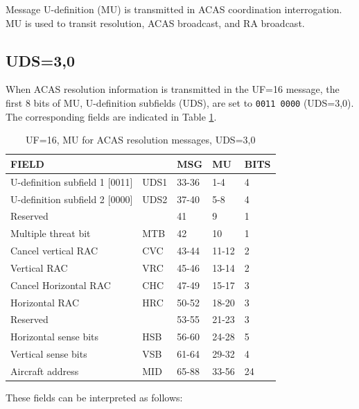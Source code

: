 Message U-definition (MU) is transmitted in ACAS coordination interrogation. MU is used to transit resolution, ACAS broadcast, and RA broadcast.


\subsection{UDS=3,0}

When ACAS resolution information is transmitted in the UF=16 message, the first 8 bits of MU, U-definition subfields (UDS), are set to \texttt{0011 0000} (UDS=3,0). The corresponding fields are indicated in Table \ref{tb:acas_mu_uds30}.

\begin{table}[ht]
\caption{UF=16, MU for ACAS resolution messages, UDS=3,0}
\label{tb:acas_mu_uds30}
\begin{tabular}{|l|l|l|l|l|}
\hline
\textbf{FIELD} & \textbf{} & \textbf{MSG} & \textbf{MU} & \textbf{BITS} \\ \hline
U-definition subfield 1 [0011] & UDS1 & 33-36 & 1-4 & 4 \\ \hline
U-definition subfield 2 [0000] & UDS2 & 37-40 & 5-8 & 4 \\ \hline
Reserved &  & 41 & 9 & 1 \\ \hline
Multiple threat bit & MTB & 42 & 10 & 1 \\ \hline
Cancel vertical RAC & CVC & 43-44 & 11-12 & 2 \\ \hline
Vertical RAC & VRC & 45-46 & 13-14 & 2 \\ \hline
Cancel Horizontal RAC & CHC & 47-49 & 15-17 & 3 \\ \hline
Horizontal RAC & HRC & 50-52 & 18-20 & 3 \\ \hline
Reserved &  & 53-55 & 21-23 & 3 \\ \hline
Horizontal sense bits & HSB & 56-60 & 24-28 & 5 \\ \hline
Vertical sense bits & VSB & 61-64 & 29-32 & 4 \\ \hline
Aircraft address & MID & 65-88 & 33-56 & 24 \\ \hline
\end{tabular}
\end{table}

These fields can be interpreted as follows:

